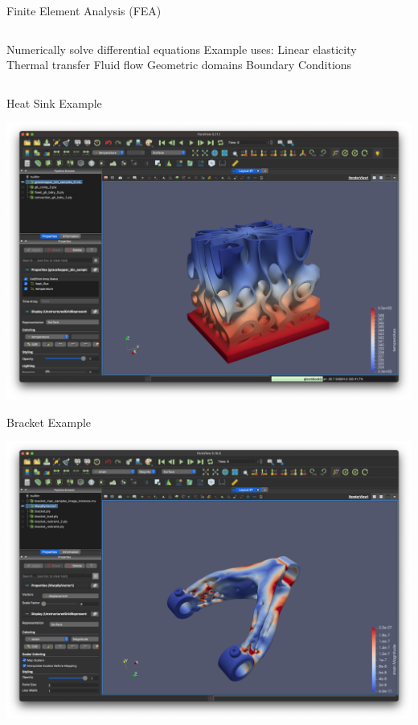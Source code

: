 \placelogofalse
\begin{frame}{Finite Element Analysis (FEA)}
\begin{columns}
\centering
\begin{outline}
  \1 Numerically solve differential equations
  \1 Example uses:
  \2 Linear elasticity
  \2 Thermal transfer
  \2 Fluid flow
  \1 Geometric domains
  \1 Boundary Conditions
\end{outline}

\centering
\begin{center}



\end{center}
\end{columns}
\end{frame}
\placelogotrue

\begin{frame}{Heat Sink Example}
  \centering
  \begin{center}
    \includegraphics[width=0.7\linewidth]{heat_sink_example.png}
  \end{center}
\end{frame}

\begin{frame}{Bracket Example}
  \centering
  \begin{center}
    \includegraphics[width=0.7\linewidth]{bracket_demo.png}
  \end{center}
\end{frame}

